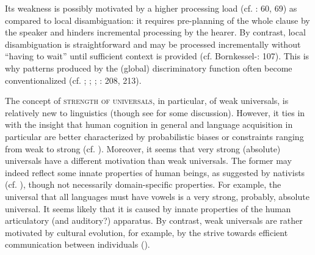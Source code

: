 \documentclass[output=paper]{langsci/langscibook}
\begin{document}
Its weakness is possibly motivated by a higher processing load (cf. \citealt{Hawkins2014}: 60, 69) as compared to local disambiguation: it requires pre-planning of the whole clause by the speaker and hinders incremental processing by the hearer. By contrast, local disambiguation is straightforward and may be processed incrementally without “having to wait” until sufficient context is provided (cf. Bornkessel-\citealt{SchlesewskySchlesewsky2014}: 107). This is why patterns produced by the (global) discriminatory function often become conventionalized (cf. \citealt{Aissen2003}; \citealt{ZeevatJäger2002}; \citealt{Jäger2004}; \citealt{Malchukov2008}: 208, 213).

The concept of \textsc{strength of universals}, in particular, of weak universals, is relatively new to linguistics (though see \citealt{Bickel2013} for some discussion). However, it ties in with the insight that human cognition in general and language acquisition in particular are better characterized by probabilistic biases or constraints ranging from weak to strong (cf. \citealt{ThompsonEtAl2016}). Moreover, it seems that very strong (absolute) universals have a different motivation than weak universals. The former may indeed reflect some innate properties of human beings, as suggested by nativists (cf. \citealt{Chomsky1965}), though not necessarily domain-specific properties. For example, the universal that all languages must have vowels \citep[19]{Comrie1989} is a very strong, probably, absolute universal. It seems likely that it is caused by innate properties of the human articulatory (and auditory?) apparatus. By contrast, weak universals are rather motivated by cultural evolution, for example, by the strive towards efficient communication between individuals (\citealt{Haspelmath2019 [this volume]}). 
\end{document}
